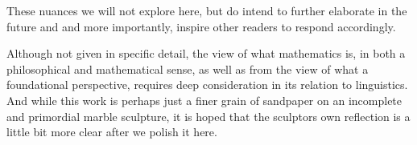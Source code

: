 These nuances we will not explore here, but do intend to further elaborate in the
future and and more importantly, inspire other readers to respond accordingly.

Although not given in specific detail, the view of what mathematics is, in both
a philosophical and mathematical sense, as well as from the view of what a
foundational perspective, requires deep consideration in its relation to
linguistics. And while this work is perhaps just a finer grain of sandpaper on
an incomplete and primordial marble sculpture, it is hoped that the sculptors
own reflection is a little bit more clear after we polish it here.


